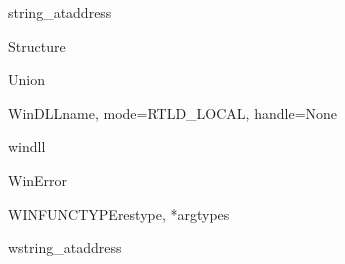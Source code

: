 \begin{funcdesc}{string_at}{address}
\end{funcdesc}

\begin{classdesc}{Structure}{}
\end{classdesc}

\begin{classdesc}{Union}{}
\end{classdesc}

\begin{classdesc}{WinDLL}{name, mode=RTLD_LOCAL, handle=None}
\end{classdesc}

\begin{datadesc}{windll}
\end{datadesc}

\begin{funcdesc}{WinError}{}
\end{funcdesc}

\begin{funcdesc}{WINFUNCTYPE}{restype, *argtypes}
\end{funcdesc}

\begin{funcdesc}{wstring_at}{address}
\end{funcdesc}

